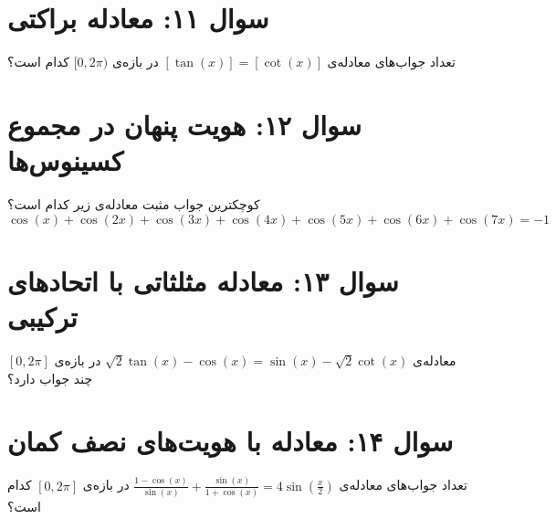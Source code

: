 \documentclass[12pt]{article}
\begin{document}
	
	\vspace{1cm}
	\hrulefill
	\vspace{1cm}
	\section*{سوال ۱۱: معادله براکتی }
	تعداد جواب‌های معادله‌ی \( [\tan(x)] = [\cot(x)] \) در بازه‌ی \( [0, 2\pi) \) کدام است؟
	
	
	\vspace{1cm}
	\hrulefill
	\vspace{1cm}
	\section*{سوال ۱۲: هویت پنهان در مجموع کسینوس‌ها}
	کوچکترین جواب مثبت معادله‌ی زیر کدام است؟
	\[ \cos(x) + \cos(2x) + \cos(3x) + \cos(4x) + \cos(5x) + \cos(6x) + \cos(7x) = -1 \]
	
	
	\vspace{1cm}
	\hrulefill
	\vspace{1cm}
	\section*{سوال ۱۳: معادله مثلثاتی با اتحادهای ترکیبی}
	معادله‌ی \( \sqrt{2} \tan(x) - \cos(x) = \sin(x) - \sqrt{2} \cot(x) \) در بازه‌ی \( [0, 2\pi] \) چند جواب دارد؟
	
	
	\vspace{1cm}
	\hrulefill
	\vspace{1cm}
	\section*{سوال ۱۴: معادله با هویت‌های نصف کمان}
	تعداد جواب‌های معادله‌ی \( \frac{1 - \cos(x)}{\sin(x)} + \frac{\sin(x)}{1 + \cos(x)} = 4\sin(\frac{x}{2}) \) در بازه‌ی \( [0, 2\pi] \) کدام است؟
	
	
	\vspace{1cm}
	\hrulefill
	\vspace{1cm}
\end{document}
